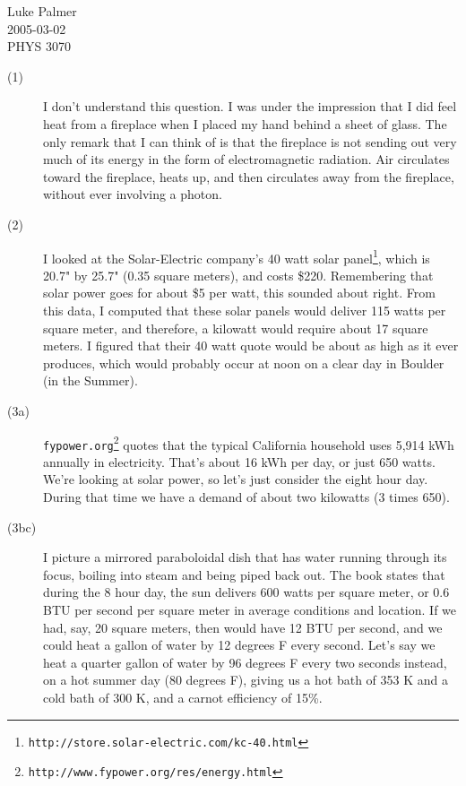 \documentclass[12pt]{article}
\begin{document}
\noindent
Luke Palmer \\
2005-03-02 \\
PHYS 3070

\begin{description}
\item[(1)] I don't understand this question.  I was under the impression
that I did feel heat from a fireplace when I placed my hand behind a
sheet of glass.  The only remark that I can think of is that the
fireplace is not sending out very much of its energy in the form of
electromagnetic radiation.  Air circulates toward the fireplace, heats
up, and then circulates away from the fireplace, without ever involving
a photon. 

\item[(2)] I looked at the Solar-Electric company's 40 watt solar
panel\footnote{\texttt{http://store.solar-electric.com/kc-40.html}},
which is 20.7" by 25.7" (0.35 square meters), and costs \$220.
Remembering that solar power goes for about \$5 per watt, this sounded
about right.  From this data, I computed that these solar panels would
deliver 115 watts per square meter, and therefore, a kilowatt would
require about 17 square meters.  I figured that their 40 watt quote
would be about as high as it ever produces, which would probably occur
at noon on a clear day in Boulder (in the Summer).

\item[(3a)]
\texttt{fypower.org}\footnote{\texttt{http://www.fypower.org/res/energy.html}}
quotes that the typical California household uses 5,914 kWh annually in
electricity.  That's about 16 kWh per day, or just 650 watts.  We're
looking at solar power, so let's just consider the eight hour day.
During that time we have a demand of about two kilowatts (3 times 650).

\item[(3bc)] I picture a mirrored paraboloidal dish that has water
running through its focus, boiling into steam and being piped back out.
The book states that during the 8 hour day, the sun delivers 600 watts
per square meter, or 0.6 BTU per second per square meter in average
conditions and location.  If we had, say, 20 square meters, then would
have 12 BTU per second, and we could heat a gallon of water by 12
degrees F every second.  Let's say we heat a quarter gallon of water by
96 degrees F every two seconds instead, on a hot summer day (80 degrees
F), giving us a hot bath of 353 K and a cold bath of 300 K, and a carnot
efficiency of 15\%.


\end{description}
\end{document}
